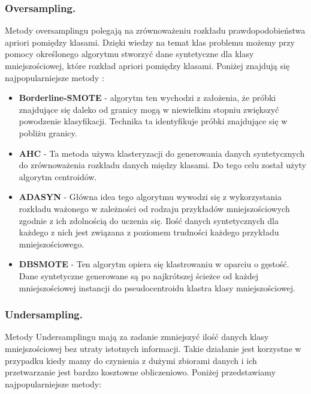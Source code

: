 \documentclass{article}
\begin{document}
\subsubsection{Oversampling.} 
\hfill \break
Metody oversamplingu polegają na zrównoważeniu rozkładu prawdopodobieństwa apriori pomiędzy klasami. Dzięki wiedzy na temat klas problemu możemy przy pomocy określonego algorytmu stworzyć dane syntetyczne dla klasy mniejszościowej, które rozkład apriori pomiędzy klasami. Poniżej znajdują się najpopularniejsze metody \cite{10.5555/3241691.3241712}:
\begin{itemize}

    \item\textbf{Borderline-SMOTE} - algorytm ten wychodzi z założenia, że próbki znajdujące się daleko od granicy mogą w niewielkim stopniu zwiększyć powodzenie klasyfikacji. Technika ta identyfikuje próbki znajdujące się w pobliżu granicy.
    \newline
    \item \textbf{AHC} - Ta metoda używa klasteryzacji do generowania danych syntetycznych do zrównoważenia rozkładu danych między klasami. Do tego celu został użyty algorytm centroidów.
    \newline
    \item \textbf{ADASYN} - Główna idea tego algorytmu wywodzi się z wykorzystania rozkładu ważonego w zależności od rodzaju przykładów mniejszościowych zgodnie z ich zdolnością do uczenia się. Ilość danych syntetycznych dla każdego z nich jest związana z poziomem trudności każdego przykładu mniejszościowego.
    \newline
    \item \textbf{DBSMOTE} - Ten algorytm opiera się klastrowaniu w oparciu o gęstość. Dane syntetyczne generowane są po  najkrótszej ścieżce od każdej mniejszościowej instancji do pseudocentroidu klastra klasy mniejszościowej.
    \newline
\end{itemize}
\subsubsection{Undersampling.}
\hfill \break
Metody Undersamplingu mają za zadanie zmniejszyć ilość danych klasy mniejszościowej bez utraty istotnych informacji. Takie działanie jest korzystne w przypadku kiedy mamy do czynienia z dużymi zbiorami danych i ich przetwarzanie jest bardzo kosztowne obliczeniowo. Poniżej przedstawiamy najpopularniejsze metody:
\end{document}
